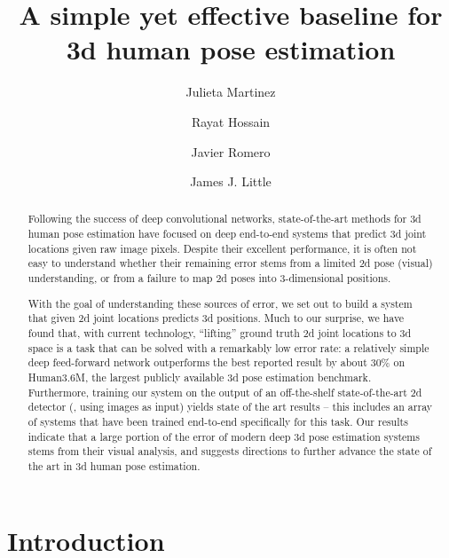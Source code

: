 \documentclass[10pt,twocolumn,letterpaper]{article}
\begin{document}
\title{A simple yet effective baseline for 3d human pose estimation\vspace{-1ex}} 

\author[1]{Julieta Martinez}
\author[1]{Rayat Hossain}
\author[2]{Javier Romero}
\author[1]{James J. Little}
\maketitle


\begin{abstract}
Following the success of deep convolutional networks, state-of-the-art methods for 3d human pose estimation have focused on deep end-to-end systems that predict 3d joint locations given raw image pixels.
Despite their excellent performance, it is often not easy to understand whether their remaining error stems from a limited 2d pose (visual) understanding, or from a failure to map 2d poses into 3-dimensional positions.

With the goal of understanding these sources of error, we set out to build a system that given 2d joint locations predicts 3d positions. Much to our surprise, we have found that, with current technology, ``lifting'' ground truth 2d joint locations to 3d space is a task that can be solved with a remarkably low error rate: a relatively simple deep feed-forward network outperforms the best reported result by about 30\% on Human3.6M, the largest publicly available 3d pose estimation benchmark. Furthermore, training our system on the output of an off-the-shelf state-of-the-art 2d detector (\ie, using images as input) yields state of the art results --
this includes an array of systems that have been trained end-to-end specifically for 
this task.
Our results indicate that a large portion of the error of 
modern
deep 3d pose estimation systems stems from their visual analysis, and suggests directions to further advance the state of the art in 3d human pose estimation.
\end{abstract}

\section{Introduction}
\end{document}
